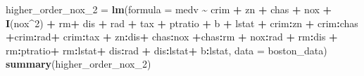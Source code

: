 \documentclass[
]{article}
\newenvironment{Shaded}{\begin{snugshade}}{\end{snugshade}}
\newcommand{\AttributeTok}[1]{\textcolor[rgb]{0.13,0.29,0.53}{#1}}
\newcommand{\DecValTok}[1]{\textcolor[rgb]{0.00,0.00,0.81}{#1}}
\newcommand{\FunctionTok}[1]{\textcolor[rgb]{0.13,0.29,0.53}{\textbf{#1}}}
\newcommand{\NormalTok}[1]{#1}
\newcommand{\OtherTok}[1]{\textcolor[rgb]{0.56,0.35,0.01}{#1}}
\newcommand{\SpecialCharTok}[1]{\textcolor[rgb]{0.81,0.36,0.00}{\textbf{#1}}}
\begin{document}
\begin{Shaded}
\begin{Highlighting}[]
\NormalTok{higher\_order\_nox\_2 }\OtherTok{=} \FunctionTok{lm}\NormalTok{(}\AttributeTok{formula =}\NormalTok{ medv }\SpecialCharTok{\textasciitilde{}}\NormalTok{ crim }\SpecialCharTok{+}\NormalTok{ zn }\SpecialCharTok{+}\NormalTok{ chas }\SpecialCharTok{+}\NormalTok{ nox }\SpecialCharTok{+} \FunctionTok{I}\NormalTok{(nox}\SpecialCharTok{\^{}}\DecValTok{2}\NormalTok{) }\SpecialCharTok{+}\NormalTok{ rm}\SpecialCharTok{+}\NormalTok{ dis }\SpecialCharTok{+}\NormalTok{ rad }\SpecialCharTok{+}\NormalTok{ tax }\SpecialCharTok{+}\NormalTok{ ptratio }\SpecialCharTok{+}\NormalTok{ b }\SpecialCharTok{+}\NormalTok{ lstat }\SpecialCharTok{+}\NormalTok{ crim}\SpecialCharTok{:}\NormalTok{zn }\SpecialCharTok{+}\NormalTok{ crim}\SpecialCharTok{:}\NormalTok{chas  }\SpecialCharTok{+}\NormalTok{crim}\SpecialCharTok{:}\NormalTok{rad}\SpecialCharTok{+}\NormalTok{ crim}\SpecialCharTok{:}\NormalTok{tax }\SpecialCharTok{+}\NormalTok{ zn}\SpecialCharTok{:}\NormalTok{dis}\SpecialCharTok{+}\NormalTok{ chas}\SpecialCharTok{:}\NormalTok{nox }\SpecialCharTok{+}\NormalTok{chas}\SpecialCharTok{:}\NormalTok{rm }\SpecialCharTok{+}\NormalTok{ nox}\SpecialCharTok{:}\NormalTok{rad }\SpecialCharTok{+}\NormalTok{ rm}\SpecialCharTok{:}\NormalTok{dis }\SpecialCharTok{+}\NormalTok{ rm}\SpecialCharTok{:}\NormalTok{ptratio}\SpecialCharTok{+}\NormalTok{ rm}\SpecialCharTok{:}\NormalTok{lstat}\SpecialCharTok{+}\NormalTok{ dis}\SpecialCharTok{:}\NormalTok{rad }\SpecialCharTok{+}\NormalTok{ dis}\SpecialCharTok{:}\NormalTok{lstat}\SpecialCharTok{+}\NormalTok{ b}\SpecialCharTok{:}\NormalTok{lstat, }\AttributeTok{data =}\NormalTok{ boston\_data)}
\FunctionTok{summary}\NormalTok{(higher\_order\_nox\_2)}
\end{Highlighting}
\end{Shaded}
\end{document}

